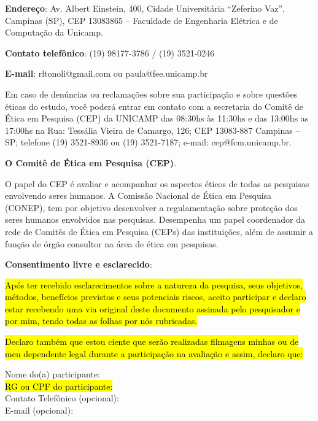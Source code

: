 \documentclass[a4paper, 12pt]{article}
\begin{document}
\textbf{Endereço}: Av. Albert Einstein, 400, Cidade Universitária “Zeferino Vaz”, Campinas (SP), CEP
13083865 – Faculdade de Engenharia Elétrica e de Computação da Unicamp.

\textbf{Contato telefônico}: (19) 98177-3786 / (19) 3521-0246

\textbf{E-mail}: rltonoli@gmail.com ou paula@fee.unicamp.br

Em caso de denúncias ou reclamações sobre sua participação e sobre questões éticas do estudo,
você poderá entrar em contato com a secretaria do Comitê de Ética em Pesquisa (CEP) da UNICAMP das 08:30hs às 11:30hs e das 13:00hs as 17:00hs na Rua: Tessália Vieira de Camargo, 126; CEP 13083-887 Campinas – SP; telefone (19) 3521-8936 ou (19) 3521-7187; e-mail: cep@fcm.unicamp.br.

\vspace{10pt}
\textbf{O Comitê de Ética em Pesquisa (CEP)}.

O papel do CEP é avaliar e acompanhar os aspectos éticos de todas as pesquisas envolvendo seres humanos. A Comissão Nacional de Ética em Pesquisa (CONEP), tem por objetivo desenvolver a regulamentação sobre proteção dos seres humanos
envolvidos nas pesquisas. Desempenha um papel coordenador da rede de Comitês de
Ética em Pesquisa (CEPs) das instituições, além de assumir a função de órgão
consultor na área de ética em pesquisas.
\vspace{10pt}

\textbf{Consentimento livre e esclarecido}:

\hl{Após ter recebido esclarecimentos sobre a natureza da pesquisa, seus objetivos, métodos, benefícios
previstos e seus potenciais riscos, aceito participar e declaro estar
recebendo uma via original deste documento assinada pelo pesquisador e por mim, tendo todas as folhas
por nós rubricadas.}

\hl{Declaro também que estou ciente que serão realizadas filmagens minhas ou de meu dependente legal durante a participação na avaliação e assim, declaro que:}

\vspace{5pt}
\noindent Nome do(a) participante:\hrulefill\\
\noindent \hl{RG ou CPF do participante:}\hrulefill\\
\noindent Contato Telefônico (opcional):\hrulefill\\
E-mail (opcional):\hrulefill\\
\vspace{5pt}
\end{document}
